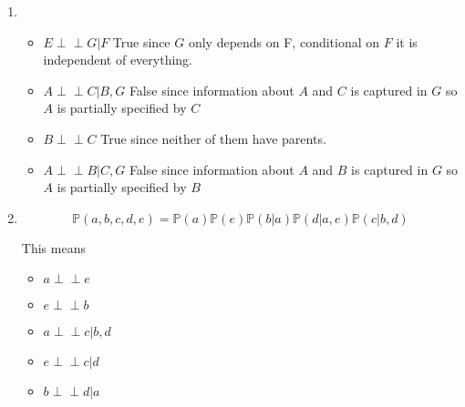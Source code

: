 \documentclass[10pt]{article}
\theoremstyle{definition}
\theoremstyle{remark}
\def\P{\mathbb{P}}
\def\indep{\!\perp\!\!\!\perp}
\begin{document}
\begin{enumerate}
    \item \begin{itemize}
        \item $E\indep G | F$
            True since $G$ only depends on F, conditional on
            $F$ it is independent of everything.
        \item $A\indep C | B,G$
            False since information about $A$ and $C$ is captured in $G$ so $A$
            is partially specified by $C$
        \item $B\indep C$
            True since neither of them have parents.
        \item $A\indep B | C,G$
            False since information about $A$ and $B$ is captured in $G$ so $A$
            is partially specified by $B$


    \end{itemize}
    \item $$
        \P(a,b,c,d,e) = \P(a)\P(e)\P(b|a)\P(d|a,e)\P(c|b,d)
    $$

    This means \begin{itemize}
        \item $a\indep e$
        \item $e\indep b$
        \item $a\indep c|b,d$
        \item $e\indep c|d$
        \item $b\indep d|a$
    \end{itemize}

\end{enumerate}

\end{document}
